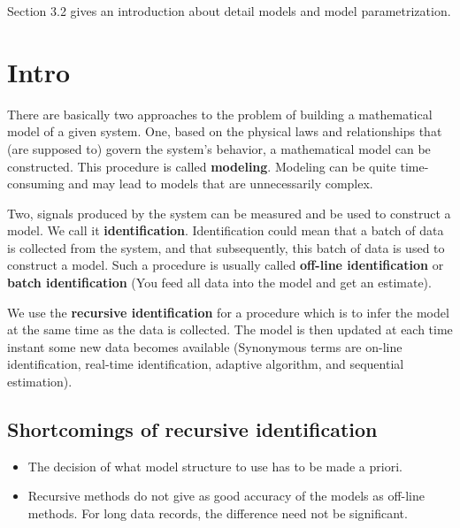 \documentclass[10pt]{article}
\title{}
\author{}
\date{}
\begin{document}
\maketitle


Section 3.2 gives an introduction about detail models and model parametrization.

\section{Intro}

There are basically two approaches to the problem of building a mathematical model
of a given system.
One, based on the physical laws and relationships that (are supposed to) govern the
system's behavior, a mathematical model can be constructed. This procedure is
called {\textbf {modeling}}. Modeling can be quite time-consuming and may lead to models
that are unnecessarily complex.

Two, signals produced by the  system can be measured and be used to construct a model.
We call it {\textbf {identification}}.
Identification could mean that a batch of data is collected from the system, and that
subsequently, this batch of data is used to construct a model. Such a procedure is 
usually called {\textbf {off-line identification}} or {\textbf {batch identification}}
(You feed all data into the model and get an estimate).


We use the {\textbf {recursive identification}} for a procedure which is to infer the
model at the same time as the data is collected. The model is then updated at each time
instant some new data becomes available (Synonymous terms are on-line identification,
real-time identification, adaptive algorithm, and sequential estimation).




\subsection{Shortcomings of recursive identification}
\begin{itemize}
\item The decision of what model structure to use has to be made a priori.
\item Recursive methods do not give as good accuracy of the models as off-line methods.
		For long data records, the difference need not be significant.
\end{itemize}







\end{document}
